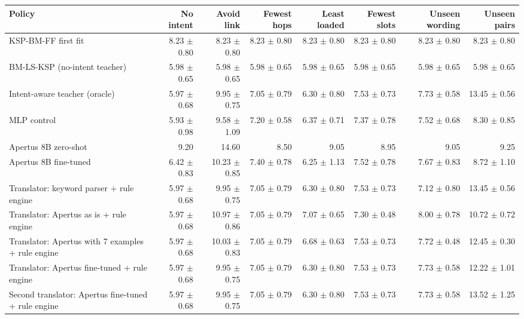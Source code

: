 \begin{tabular}{lrrrrrrr}
\toprule
Policy & No intent & Avoid link & Fewest hops & Least loaded & Fewest slots & Unseen wording & Unseen pairs \\
\midrule
KSP-BM-FF first fit & 8.23 $\pm$ 0.80 & 8.23 $\pm$ 0.80 & 8.23 $\pm$ 0.80 & 8.23 $\pm$ 0.80 & 8.23 $\pm$ 0.80 & 8.23 $\pm$ 0.80 & 8.23 $\pm$ 0.80 \\
BM-LS-KSP (no-intent teacher) & 5.98 $\pm$ 0.65 & 5.98 $\pm$ 0.65 & 5.98 $\pm$ 0.65 & 5.98 $\pm$ 0.65 & 5.98 $\pm$ 0.65 & 5.98 $\pm$ 0.65 & 5.98 $\pm$ 0.65 \\
Intent-aware teacher (oracle) & 5.97 $\pm$ 0.68 & 9.95 $\pm$ 0.75 & 7.05 $\pm$ 0.79 & 6.30 $\pm$ 0.80 & 7.53 $\pm$ 0.73 & 7.73 $\pm$ 0.58 & 13.45 $\pm$ 0.56 \\
MLP control & 5.93 $\pm$ 0.98 & 9.58 $\pm$ 1.09 & 7.20 $\pm$ 0.58 & 6.37 $\pm$ 0.71 & 7.37 $\pm$ 0.78 & 7.52 $\pm$ 0.68 & 8.30 $\pm$ 0.85 \\
Apertus 8B zero-shot & 9.20 & 14.60 & 8.50 & 9.05 & 8.95 & 9.05 & 9.25 \\
Apertus 8B fine-tuned & 6.42 $\pm$ 0.83 & 10.23 $\pm$ 0.85 & 7.40 $\pm$ 0.78 & 6.25 $\pm$ 1.13 & 7.52 $\pm$ 0.78 & 7.67 $\pm$ 0.83 & 8.72 $\pm$ 1.10 \\
Translator: keyword parser + rule engine & 5.97 $\pm$ 0.68 & 9.95 $\pm$ 0.75 & 7.05 $\pm$ 0.79 & 6.30 $\pm$ 0.80 & 7.53 $\pm$ 0.73 & 7.12 $\pm$ 0.80 & 13.45 $\pm$ 0.56 \\
Translator: Apertus as is + rule engine & 5.97 $\pm$ 0.68 & 10.97 $\pm$ 0.86 & 7.05 $\pm$ 0.79 & 7.07 $\pm$ 0.65 & 7.30 $\pm$ 0.48 & 8.00 $\pm$ 0.78 & 10.72 $\pm$ 0.72 \\
Translator: Apertus with 7 examples + rule engine & 5.97 $\pm$ 0.68 & 10.03 $\pm$ 0.83 & 7.05 $\pm$ 0.79 & 6.68 $\pm$ 0.63 & 7.53 $\pm$ 0.73 & 7.72 $\pm$ 0.48 & 12.45 $\pm$ 0.30 \\
Translator: Apertus fine-tuned + rule engine & 5.97 $\pm$ 0.68 & 9.95 $\pm$ 0.75 & 7.05 $\pm$ 0.79 & 6.30 $\pm$ 0.80 & 7.53 $\pm$ 0.73 & 7.73 $\pm$ 0.58 & 12.22 $\pm$ 1.01 \\
Second translator: Apertus fine-tuned + rule engine & 5.97 $\pm$ 0.68 & 9.95 $\pm$ 0.75 & 7.05 $\pm$ 0.79 & 6.30 $\pm$ 0.80 & 7.53 $\pm$ 0.73 & 7.73 $\pm$ 0.58 & 13.52 $\pm$ 1.25 \\
\bottomrule
\end{tabular}

